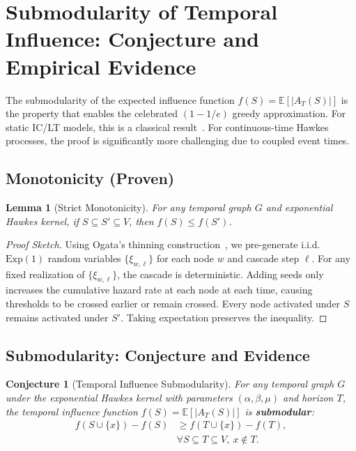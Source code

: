 \documentclass[10pt,conference]{IEEEtran}
\newtheorem{lemma}{Lemma}
\newtheorem{conjecture}{Conjecture}
\begin{document}
\section{Submodularity of Temporal Influence: Conjecture and Empirical Evidence}

The submodularity of the expected influence function $f(S) = \mathbb{E}[|A_T(S)|]$ is the property that enables the celebrated $(1-1/e)$ greedy approximation.
For static IC/LT models, this is a classical result~\cite{kempe2003}.
For continuous-time Hawkes processes, the proof is significantly more challenging due to coupled event times.

\subsection{Monotonicity (Proven)}

\begin{lemma}[Strict Monotonicity]
\label{lem:monotonicity}
For any temporal graph $G$ and exponential Hawkes kernel, if $S \subseteq S' \subseteq V$, then $f(S) \le f(S')$.
\end{lemma}

\begin{proof}[Proof Sketch]
Using Ogata's thinning construction~\cite{ogata1981}, we pre-generate i.i.d.~$\text{Exp}(1)$ random variables $\{\xi_{w,\ell}\}$ for each node $w$ and cascade step $\ell$.
For any fixed realization of $\{\xi_{w,\ell}\}$, the cascade is deterministic.
Adding seeds only increases the cumulative hazard rate at each node at each time, causing thresholds to be crossed earlier or remain crossed.
Every node activated under $S$ remains activated under $S'$.
Taking expectation preserves the inequality.
\end{proof}

\subsection{Submodularity: Conjecture and Evidence}

\begin{conjecture}[Temporal Influence Submodularity]
\label{conj:submodularity}
For any temporal graph $G$ under the exponential Hawkes kernel with parameters $(\alpha, \beta, \mu)$ and horizon $T$, the temporal influence function $f(S) = \mathbb{E}[|A_T(S)|]$ is \textbf{submodular}:
\begin{equation}
\begin{aligned}
f(S \cup \{x\}) - f(S)
&\ge f(T \cup \{x\}) - f(T),\\
&\forall S \subseteq T \subseteq V,\ x \notin T.
\end{aligned}
\label{eq:submodularity}
\end{equation}
\end{conjecture}
\end{document}

